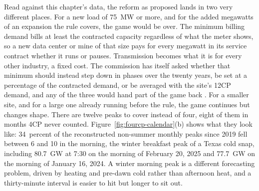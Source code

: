 Read against this chapter's data, the reform as proposed lands in two very different places. For a new load of 75~MW or more, and for the added megawatts of an expansion the rule covers, the game would be over. The minimum billing demand bills at least the contracted capacity regardless of what the meter shows, so a new data center or mine of that size pays for every megawatt in its service contract whether it runs or pauses. Transmission becomes what it is for every other industry, a fixed cost. The commission has itself asked whether that minimum should instead step down in phases over the twenty years, be set at a percentage of the contracted demand, or be averaged with the site's 12CP demand, and any of the three would hand part of the game back \autocite{puct2026prop58000}. %
For a smaller site, and for a large one already running before the rule, the game continues but changes shape. There are twelve peaks to cover instead of four, eight of them in months 4CP never counted. Figure~\ref{fig:fourcp-calendar}(b) shows what they look like: 34~percent of the reconstructed non-summer monthly peaks since 2019 fell between 6 and 10 in the morning, the winter breakfast peak of a Texas cold snap, including 80.7~GW at 7:30 on the morning of February 20, 2025 and 77.7~GW on the morning of January 16, 2024. %
A winter morning peak is a different forecasting problem, driven by heating and pre-dawn cold rather than afternoon heat, and a thirty-minute interval is easier to hit but longer to sit out.

